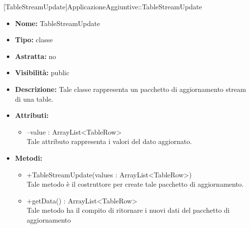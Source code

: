 			[TableStreamUpdate]{ApplicazioneAggiuntive::TableStreamUpdate}
			

	
			
			\begin{itemize}
			\item \textbf{Nome:} TableStreamUpdate
			\item \textbf{Tipo:} classe
			
		\item \textbf{Astratta:}
		no
			\item \textbf{Visibilità:} public
			\item \textbf{Descrizione:} Tale classe rappresenta un pacchetto di aggiornamento stream di una table.
			\item \textbf{Attributi:}
				\begin{itemize}
				\setlength{\itemsep}{5pt}
				
					\item[\ding{111}] {--value : ArrayList<TableRow>} \\ [1mm] Tale attributo rappresenta i valori del dato aggiornato.
				\end{itemize}
		
			\item \textbf{Metodi:}
				\begin{itemize}
				\setlength{\itemsep}{5pt}
				
					\item[\ding{111}] {{+TableStreamUpdate(values : ArrayList<TableRow>)}} \\ [1mm] Tale metodo è il costruttore per create tale pacchetto di aggiornamento.
					\item[\ding{111}] {{+getData() : ArrayList<TableRow>}} \\ [1mm] Tale metodo ha il compito di ritornare i nuovi dati del pacchetto di aggiornamento
				\end{itemize}
		
			\end{itemize}
	